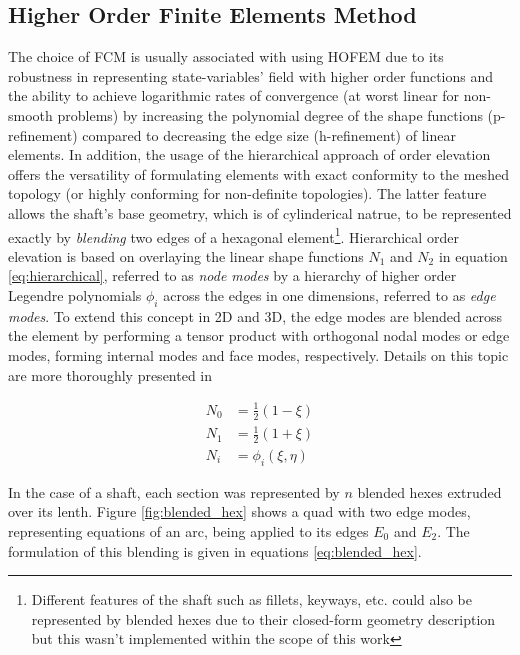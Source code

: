 \subsection{Higher Order Finite Elements Method}
The choice of FCM is usually associated with using HOFEM due to its robustness in representing state-variables' field with higher order functions and the ability to achieve logarithmic rates of convergence (at worst linear for non-smooth problems) by increasing the polynomial degree of the shape functions (p-refinement) compared to decreasing the edge size (h-refinement) of linear elements. In addition, the usage of the hierarchical approach of order elevation offers the versatility of formulating elements with exact conformity to the meshed topology (or highly conforming for non-definite topologies). The latter feature allows the shaft's base geometry, which is of cylinderical natrue, to be represented exactly by \emph{blending} two edges of a hexagonal element\footnote{Different features of the shaft such as fillets, keyways, etc. could also be represented by blended hexes due to their closed-form geometry description but this wasn't implemented within the scope of this work}.
Hierarchical order elevation is based on overlaying the linear shape functions $N_1$ and $N_2$ in equation \ref{eq:hierarchical}, referred to as \textit{node modes} by a hierarchy of higher order Legendre polynomials $\phi_i$ across the edges in one dimensions, referred to as \textit{edge modes}. To extend this concept in 2D and 3D, the edge modes are blended across the element by performing a tensor product with orthogonal nodal modes or edge modes, forming internal modes and face modes, respectively. Details on this topic are more thoroughly presented in \citep{hofem_script}

\begin{subequations}
\label{eq:hierarchical}
\begin{align}
N_0 &= \frac{1}{2}(1 - \xi) \\
N_1 &= \frac{1}{2}(1 + \xi) \\
N_i &= \phi_{i}(\xi, \eta)
\end{align}
\end{subequations}

In the case of a shaft, each section was represented by $n$ blended hexes extruded over its lenth. Figure \ref{fig:blended_hex} shows a quad with two edge modes, representing equations of an arc, being applied to its edges $E_0$ and $E_2$. The formulation of this blending is given in equations \ref{eq:blended_hex}.

